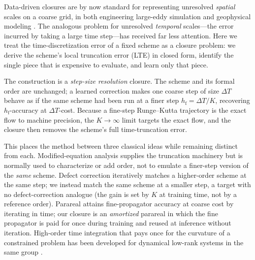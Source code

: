 \documentclass[11pt]{article}
\theoremstyle{plain}
\theoremstyle{definition}
\newcommand{\DT}{\Delta T}
\newcommand{\hf}{h_{\mathrm{f}}}
\begin{document}
Data-driven closures are by now standard for representing unresolved
\emph{spatial} scales on a coarse grid, in both engineering large-eddy
simulation and geophysical modeling \citep{gupta2021,guan2022,srinivasan2024}.
The analogous problem for unresolved \emph{temporal} scales---the error
incurred by taking a large time step---has received far less attention. Here we
treat the time-discretization error of a fixed scheme as a closure problem: we
derive the scheme's local truncation error (LTE) in closed form, identify the
single piece that is expensive to evaluate, and learn only that piece.

The construction is a \emph{step-size resolution} closure. The scheme and its
formal order are unchanged; a learned correction makes one coarse step of size
$\DT$ behave as if the same scheme had been run at a finer step $\hf=\DT/K$,
recovering $\hf$-accuracy at $\DT$-cost. Because a fine-step Runge--Kutta
trajectory is the exact flow to machine precision, the $K\!\to\!\infty$ limit
targets the exact flow, and the closure then removes the scheme's full
time-truncation error.

This places the method between three classical ideas while remaining distinct
from each. Modified-equation analysis \citep{warming1974} supplies the
truncation machinery but is normally used to characterize or add order, not to
emulate a finer-step version of the \emph{same} scheme. Defect correction
\citep{stetter1978} iteratively matches a higher-order scheme at the same step;
we instead match the same scheme at a smaller step, a target with no
defect-correction analogue (the gain is set by $K$ at training time, not by a
reference order). Parareal \citep{lions2001} attains fine-propagator accuracy
at coarse cost by iterating in time; our closure is an \emph{amortized}
parareal in which the fine propagator is paid for once during training and
reused at inference without iteration. High-order time integration that pays
once for the curvature of a constrained problem has been developed for
dynamical low-rank systems in the same group \citep{charous2023}.
\end{document}
